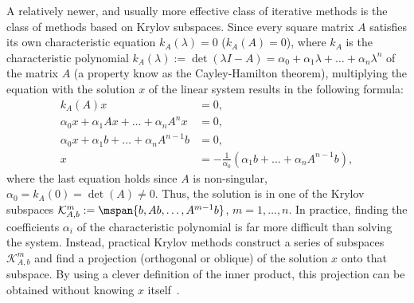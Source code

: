 A relatively newer, and usually more effective class of iterative methods is the
class of methods based on Krylov subspaces. Since every square matrix
$A$ satisfies its own characteristic equation $k_A(\lambda) = 0$ (\ie $k_A(A) =
0$), where $k_A$ is the characteristic polynomial $k_A(\lambda) := \det(\lambda
I - A) = \alpha_0 + \alpha_1 \lambda + \ldots + \alpha_n \lambda^n$ of the
matrix $A$ (a property know as the Cayley-Hamilton theorem), multiplying the
equation with the solution $x$ of the linear system results in the following
formula:
\begin{align}
    k_A(A)x &= 0,\\
    \alpha_0 x + \alpha_1 Ax + \ldots + \alpha_n A^n x &= 0,\\
    \alpha_0 x + \alpha_1 b + \ldots + \alpha_n A^{n-1} b &= 0,\\
    x &= -\frac{1}{\alpha_0}(\alpha_1 b + \ldots + \alpha_n A^{n-1}b),
\end{align}
where the last equation holds since $A$ is non-singular, \ie $\alpha_0 = k_A(0)
= \det(A) \neq 0$. Thus, the solution is in one of the Krylov subspaces
$\mathcal{K}_{A, b}^m := \mspan\{b, Ab, \ldots, A^{m-1}b\}$, $m = 1, \ldots, n$.
In practice, finding the coefficients $\alpha_i$ of the characteristic
polynomial is far more difficult than solving the system. Instead, practical
Krylov methods construct a series of subspaces $\mathcal{K}_{A,b}^m$ and find a
projection (orthogonal or oblique) of the solution $x$ onto that subspace. By
using a clever definition of the inner product, this projection can be
obtained without knowing $x$ itself~\cite{demmel,saad}.

